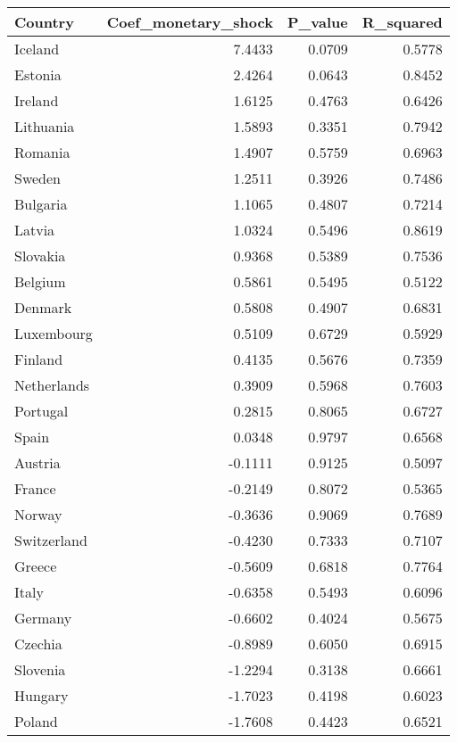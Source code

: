 \begin{tabular}{lrrr}
\toprule
Country & Coef_monetary_shock & P_value & R_squared \\
\midrule
Iceland & 7.4433 & 0.0709 & 0.5778 \\
Estonia & 2.4264 & 0.0643 & 0.8452 \\
Ireland & 1.6125 & 0.4763 & 0.6426 \\
Lithuania & 1.5893 & 0.3351 & 0.7942 \\
Romania & 1.4907 & 0.5759 & 0.6963 \\
Sweden & 1.2511 & 0.3926 & 0.7486 \\
Bulgaria & 1.1065 & 0.4807 & 0.7214 \\
Latvia & 1.0324 & 0.5496 & 0.8619 \\
Slovakia & 0.9368 & 0.5389 & 0.7536 \\
Belgium & 0.5861 & 0.5495 & 0.5122 \\
Denmark & 0.5808 & 0.4907 & 0.6831 \\
Luxembourg & 0.5109 & 0.6729 & 0.5929 \\
Finland & 0.4135 & 0.5676 & 0.7359 \\
Netherlands & 0.3909 & 0.5968 & 0.7603 \\
Portugal & 0.2815 & 0.8065 & 0.6727 \\
Spain & 0.0348 & 0.9797 & 0.6568 \\
Austria & -0.1111 & 0.9125 & 0.5097 \\
France & -0.2149 & 0.8072 & 0.5365 \\
Norway & -0.3636 & 0.9069 & 0.7689 \\
Switzerland & -0.4230 & 0.7333 & 0.7107 \\
Greece & -0.5609 & 0.6818 & 0.7764 \\
Italy & -0.6358 & 0.5493 & 0.6096 \\
Germany & -0.6602 & 0.4024 & 0.5675 \\
Czechia & -0.8989 & 0.6050 & 0.6915 \\
Slovenia & -1.2294 & 0.3138 & 0.6661 \\
Hungary & -1.7023 & 0.4198 & 0.6023 \\
Poland & -1.7608 & 0.4423 & 0.6521 \\
\bottomrule
\end{tabular}
